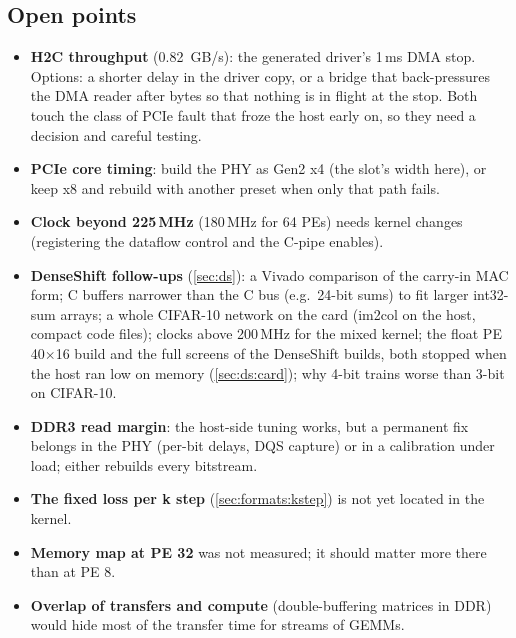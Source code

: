 \subsection{Open points}
\begin{itemize}
  \item \textbf{H2C throughput} (\SI{0.82}{GB/s}): the generated driver's 1\,ms DMA stop. Options: a shorter delay in
        the driver copy, or a bridge that back-pressures the DMA reader after  bytes so that nothing is in
        flight at the stop. Both touch the class of PCIe fault that froze the host early on, so they need a decision
        and careful testing.
  \item \textbf{PCIe core timing}: build the PHY as Gen2 x4 (the slot's width here), or keep x8 and rebuild with
        another preset when only that path fails.
  \item \textbf{Clock beyond 225\,MHz} (180\,MHz for 64 PEs) needs kernel changes (registering the dataflow control
        and the C-pipe enables).
  \item \textbf{DenseShift follow-ups} (\cref{sec:ds}): a Vivado comparison of the carry-in MAC form; C buffers
        narrower than the C bus (e.g.\ 24-bit sums) to fit larger int32-sum arrays; a whole CIFAR-10 network on the
        card (im2col on the host, compact code files); clocks above 200\,MHz for the mixed kernel; the float
        PE 40\(\times\)16 build and the full screens of the DenseShift builds, both stopped when the host ran low on
        memory (\cref{sec:ds:card}); why 4-bit trains worse than 3-bit on CIFAR-10.
  \item \textbf{DDR3 read margin}: the host-side tuning works, but a permanent fix belongs in the PHY (per-bit
        delays, DQS capture) or in a calibration under load; either rebuilds every bitstream.
  \item \textbf{The fixed loss per k step} (\cref{sec:formats:kstep}) is not yet located in the kernel.
  \item \textbf{Memory map at PE 32} was not measured; it should matter more there than at PE 8.
  \item \textbf{Overlap of transfers and compute} (double-buffering matrices in DDR) would hide most of the transfer
        time for streams of GEMMs.
\end{itemize}

